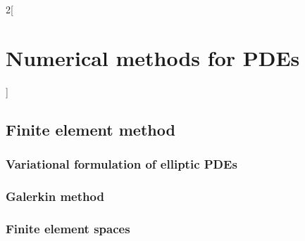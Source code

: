 \documentclass[../../../main_math.tex]{subfiles}
\begin{document}
\begin{multicols}{2}[\section{Numerical methods for PDEs}]
  \subsection{Finite element method}
  \subsubsection{Variational formulation of elliptic PDEs}

  \subsubsection{Galerkin method}

  \subsubsection{Finite element spaces}

\end{multicols}
\end{document}
